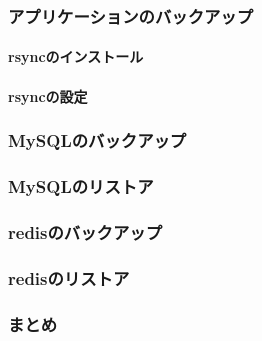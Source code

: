 
\subsubsection{アプリケーションのバックアップ}

\paragraph{rsyncのインストール}

\paragraph{rsyncの設定}

\subsubsection{MySQLのバックアップ}

\subsubsection{MySQLのリストア}

\subsubsection{redisのバックアップ}

\subsubsection{redisのリストア}

\subsubsection{まとめ}

